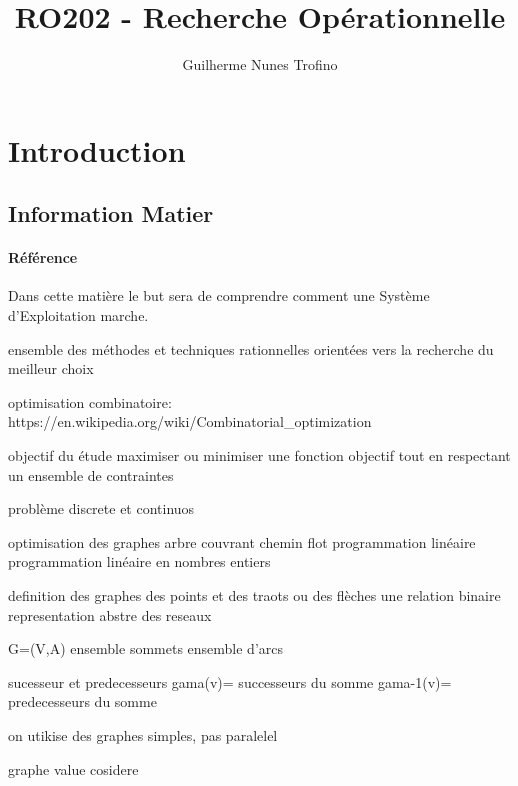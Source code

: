 \documentclass{article}
\title{RO202 - Recherche Opérationnelle}
\author{Guilherme Nunes Trofino}
\begin{document}
\maketitle
\setlength{\parindent}{0pt}

\newpage\tableofcontents

\section{Introduction}

% 
% 
% 

\subsection{Information Matier}
\paragraph{Référence}Dans cette matière le but sera de comprendre comment une Système d'Exploitation marche.

ensemble des méthodes et techniques rationnelles orientées vers la recherche du meilleur choix

optimisation combinatoire: https://en.wikipedia.org/wiki/Combinatorial_optimization

objectif du étude
maximiser ou minimiser une fonction objectif tout en respectant un ensemble de contraintes

problème discrete et continuos

optimisation des graphes
    arbre couvrant
    chemin
    flot
programmation linéaire
programmation linéaire
    en nombres entiers


definition des graphes
    des points et des traots ou des flèches
    une relation binaire
    representation abstre des reseaux

    G=(V,A)
        ensemble sommets
        ensemble d'arcs

        sucesseur et predecesseurs
        gama(v)= {successeurs du somme}
        gama-1(v)= {predecesseurs du somme}

    on utikise des graphes simples, pas paralelel

    graphe value cosidere
\end{document}
